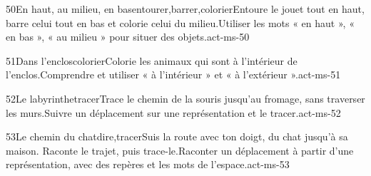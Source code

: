 \begin{activite}{50}{En haut, au milieu, en bas}{entourer,barrer,colorier}{{\otBold\color{otNavy}Entoure} le jouet tout en haut, {\otBold\color{otNavy}barre} celui tout en bas et colorie celui du milieu.}{Utiliser les mots « en haut », « en bas », « au milieu » pour situer des objets.}{act-ms-50}
\end{activite}
\begin{activite}{51}{Dans l’enclos}{colorier}{Colorie les animaux qui sont {\otBold\color{otNavy}à l’intérieur} de l’enclos.}{Comprendre et utiliser « à l’intérieur » et « à l’extérieur ».}{act-ms-51}
\end{activite}
\begin{activite}{52}{Le labyrinthe}{tracer}{Trace le chemin de la souris jusqu’au fromage, {\otBold\color{otNavy}sans traverser} les murs.}{Suivre un déplacement sur une représentation et le tracer.}{act-ms-52}
\end{activite}
\begin{activite}{53}{Le chemin du chat}{dire,tracer}{Suis la route avec ton doigt, du chat jusqu’à sa maison. {\otBold\color{otNavy}Raconte} le trajet, puis trace-le.}{Raconter un déplacement à partir d’une représentation, avec des repères et les mots de l’espace.}{act-ms-53}
\end{activite}
